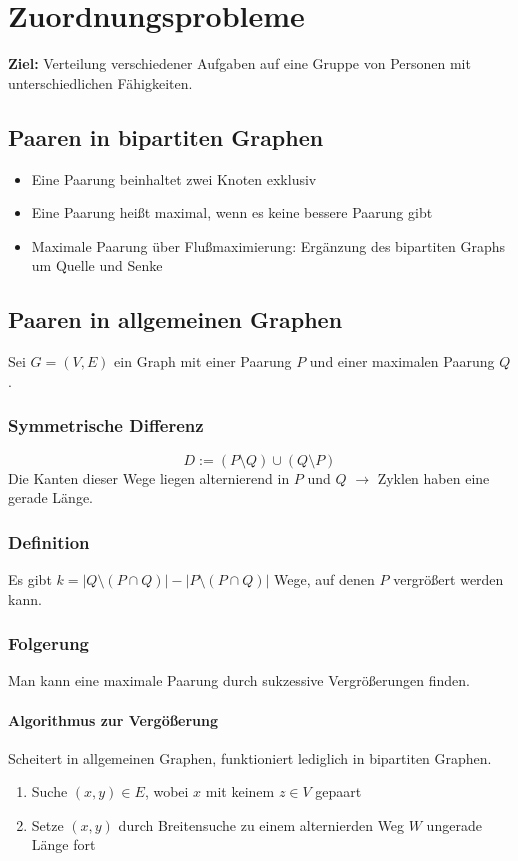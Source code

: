 \section{Zuordnungsprobleme}
\textbf{Ziel:} Verteilung verschiedener Aufgaben auf eine Gruppe von Personen mit unterschiedlichen Fähigkeiten.

\subsection{Paaren in bipartiten Graphen}
\begin{itemize}
	\item Eine Paarung beinhaltet zwei Knoten exklusiv
	\item Eine Paarung heißt maximal, wenn es keine bessere Paarung gibt
	\item Maximale Paarung über Flußmaximierung: Ergänzung des bipartiten Graphs um Quelle und Senke
\end{itemize}


\subsection{Paaren in allgemeinen Graphen}
Sei \(G=(V,E)\) ein Graph mit einer Paarung \(P\) und einer maximalen Paarung \(Q\).

\subsubsection{Symmetrische Differenz}
\[D:=(P\setminus Q) \cup (Q \setminus P)\]
Die Kanten dieser Wege liegen alternierend in \(P\) und \(Q\) \(\rightarrow\) Zyklen haben eine gerade Länge.

\subsubsection{Definition}
Es gibt \(k=|Q\setminus (P \cap Q)| - |P\setminus (P \cap Q)|\) Wege, auf denen \(P\) vergrößert werden kann.

\subsubsection{Folgerung}
Man kann eine maximale Paarung durch sukzessive Vergrößerungen finden.

\paragraph{Algorithmus zur Vergößerung}
Scheitert in allgemeinen Graphen, funktioniert lediglich in bipartiten Graphen.
\begin{enumerate}
	\item Suche \((x,y) \in E\), wobei \(x\) mit keinem \(z\in V\) gepaart
	\item Setze \((x,y)\) durch Breitensuche zu einem alternierden Weg \(W\) ungerade Länge fort
\end{enumerate}

